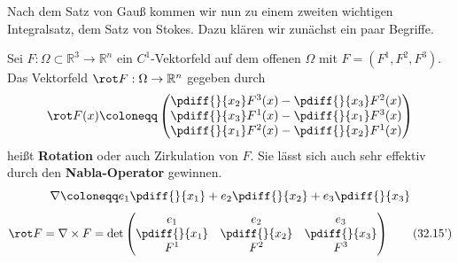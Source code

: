 Nach dem Satz von Gauß kommen wir nun zu einem zweiten wichtigen Integralsatz, dem Satz von Stokes. Dazu klären wir zunächst ein 
paar Begriffe.
\begin{definition}[Rotation]
Sei $F:\Omega\subset\mathbb{R}^3\rightarrow\mathbb{R}^n$ ein 
$C^1$-Vektorfeld auf dem offenen $\Omega$ mit $F=(F^1,F^2,F^3)$. 
Das Vektorfeld $\rot F:\Omega\rightarrow\mathbb{R}^n$ 
gegeben durch
\begin{equation}
	\rot F(x)\coloneqq 
	\begin{pmatrix}
	\pdiff{}{x_2}F^3(x)-\pdiff{}{x_3}F^2(x) \\
	\pdiff{}{x_3}F^1(x)-\pdiff{}{x_1}F^3(x) \\
	\pdiff{}{x_1}F^2(x)-\pdiff{}{x_2}F^1(x)
	\end{pmatrix}
\end{equation}
heißt \textbf{Rotation} oder auch Zirkulation von $F$. Sie 
lässt sich auch sehr effektiv durch den \textbf{Nabla-Operator} 
gewinnen. 
\begin{equation*}
	\nabla\coloneqq e_1\pdiff{}{x_1}+e_2\pdiff{}{x_2} + 
	e_3\pdiff{}{x_3}
\end{equation*}
\begin{equation*}
	\rot F=\nabla\times F=\det\begin{pmatrix}
	e_1 & e_2 & e_3 \\
	\pdiff{}{x_1} & \pdiff{}{x_2} & \pdiff{}{x_3} \\
	F^1 & F^2 & F^3  
	\end{pmatrix}
	\tag{32.15'}
\end{equation*}
\end{definition}

